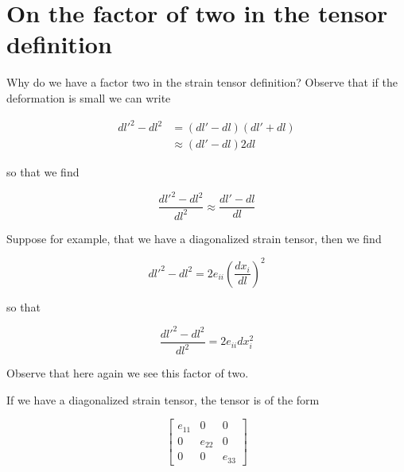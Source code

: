 \label{chap:continuumL3}

\section{On the factor of two in the tensor definition}

%
%
%
%
Why do we have a factor two in the strain tensor definition?  Observe that if the deformation is small we can write

\begin{align*}
{dl'}^2 - dl^2 
&= (dl' - dl)(dl' + dl) \\
&\approx
 (dl' - dl) 2 dl
\end{align*}

so that we find 

\begin{equation}\label{eqn:continuumL3:50}
\frac{{dl'}^2 - dl^2 }{dl^2}
\approx
\frac{dl' - dl }{dl}
\end{equation}

Suppose for example, that we have a diagonalized strain tensor, then we find

\begin{equation}\label{eqn:continuumL3:70}
{dl'}^2 - dl^2 
= 2 e_{ii} \left(\frac{dx_i}{dl}\right)^2
\end{equation}

so that

\begin{equation}\label{eqn:continuumL3:90}
\frac{
{dl'}^2 - dl^2 
}{dl^2}
= 2 e_{ii} dx_i^2
\end{equation}

Observe that here again we see this factor of two.

If we have a diagonalized strain tensor, the tensor is of the form

\begin{equation}\label{eqn:continuumL3:110}
\begin{bmatrix}
e_{11} & 0 & 0 \\
0 & e_{22} & 0 \\
0 & 0 & e_{33} 
\end{bmatrix}
\end{equation}

